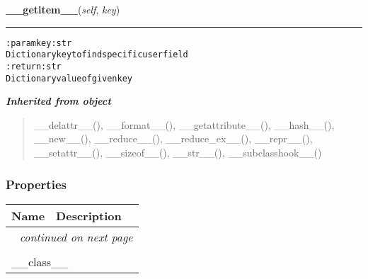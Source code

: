     \label{hal:internet:github:GithubRawApi:__getitem__}

    \vspace{0.5ex}

\hspace{.8\funcindent}\begin{boxedminipage}{\funcwidth}

    \raggedright \textbf{\_\_getitem\_\_}(\textit{self}, \textit{key})

    \vspace{-1.5ex}

    \rule{\textwidth}{0.5\fboxrule}
\setlength{\parskip}{2ex}
\begin{alltt}

:param key: str
    Dictionary key to find specific user field
:return: str
    Dictionary value of given key
\end{alltt}

\setlength{\parskip}{1ex}
    \end{boxedminipage}


\large{\textbf{\textit{Inherited from object}}}

\begin{quote}
\_\_delattr\_\_(), \_\_format\_\_(), \_\_getattribute\_\_(), \_\_hash\_\_(), \_\_new\_\_(), \_\_reduce\_\_(), \_\_reduce\_ex\_\_(), \_\_repr\_\_(), \_\_setattr\_\_(), \_\_sizeof\_\_(), \_\_str\_\_(), \_\_subclasshook\_\_()
\end{quote}


  \subsubsection{Properties}

    \vspace{-1cm}
\hspace{\varindent}\begin{longtable}{|p{\varnamewidth}|p{\vardescrwidth}|l}
\cline{1-2}
\cline{1-2} \centering \textbf{Name} & \centering \textbf{Description}& \\
\cline{1-2}
\endhead\cline{1-2}\multicolumn{3}{r}{\small\textit{continued on next page}}\\\endfoot\cline{1-2}
\endlastfoot\multicolumn{2}{|l|}{\textit{Inherited from object}}\\
\multicolumn{2}{|p{\varwidth}|}{\raggedright \_\_class\_\_}\\
\cline{1-2}
\end{longtable}


